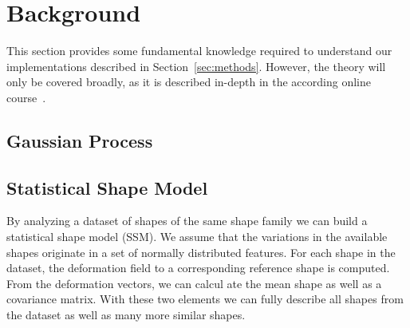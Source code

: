 \section{Background}
\label{sec:background}

This section provides some fundamental knowledge required to understand our implementations described in Section~\ref{sec:methods}.
However, the theory will only be covered broadly, as it is described in-depth in the according online course~\citep{mooc2019statistical}.


\subsection{Gaussian Process}
\label{subsec:gp}



\subsection{Statistical Shape Model}
\label{subsec:ssm}

By analyzing a dataset of shapes of the same shape family we can build a statistical shape model (SSM).
We assume that the variations in the available shapes originate in a set of normally distributed features.
For each shape in the dataset, the deformation field to a corresponding reference shape is computed.
From the deformation vectors, we can calcul ate the mean shape as well as a covariance matrix.
With these two elements  we can fully describe all shapes from the dataset as well as many more similar shapes.



